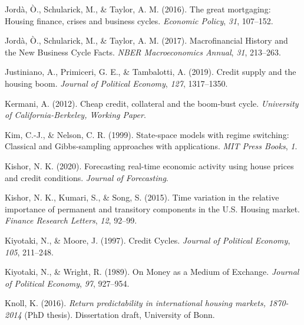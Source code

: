 \documentclass[
  12pt,
]{article}
\newlength{\cslhangindent}
\newlength{\cslentryspacingunit} %
\newenvironment{CSLReferences}[2] %
 {%
  \setlength{\parindent}{0pt}
  \ifodd #1
  \let\oldpar\par
  \def\par{\hangindent=\cslhangindent\oldpar}
  \fi
  \setlength{\parskip}{#2\cslentryspacingunit}
 }%
 {}
\begin{document}
\begin{CSLReferences}{1}{0}
\leavevmode{}%
Jordà, Ò., Schularick, M., \& Taylor, A. M. (2016). The great mortgaging: Housing finance, crises and business cycles. \emph{Economic Policy}, \emph{31}, 107--152.

\leavevmode{}%
Jordà, Ò., Schularick, M., \& Taylor, A. M. (2017). Macrofinancial {History} and the {New Business Cycle Facts}. \emph{NBER Macroeconomics Annual}, \emph{31}, 213--263.

\leavevmode{}%
Justiniano, A., Primiceri, G. E., \& Tambalotti, A. (2019). Credit supply and the housing boom. \emph{Journal of Political Economy}, \emph{127}, 1317--1350.

\leavevmode{}%
Kermani, A. (2012). Cheap credit, collateral and the boom-bust cycle. \emph{University of California-Berkeley, Working Paper}.

\leavevmode{}%
Kim, C.-J., \& Nelson, C. R. (1999). State-space models with regime switching: Classical and {Gibbs}-sampling approaches with applications. \emph{MIT Press Books}, \emph{1}.

\leavevmode{}%
Kishor, N. K. (2020). Forecasting real-time economic activity using house prices and credit conditions. \emph{Journal of Forecasting}.

\leavevmode{}%
Kishor, N. K., Kumari, S., \& Song, S. (2015). Time variation in the relative importance of permanent and transitory components in the {U}.{S}. Housing market. \emph{Finance Research Letters}, \emph{12}, 92--99.

\leavevmode{}%
Kiyotaki, N., \& Moore, J. (1997). Credit {Cycles}. \emph{Journal of Political Economy}, \emph{105}, 211--248.

\leavevmode{}%
Kiyotaki, N., \& Wright, R. (1989). On {Money} as a {Medium} of {Exchange}. \emph{Journal of Political Economy}, \emph{97}, 927--954.

\leavevmode{}%
Knoll, K. (2016). \emph{Return predictability in international housing markets, 1870-2014} (PhD thesis). Dissertation draft, University of Bonn.


\end{CSLReferences}
\end{document}

